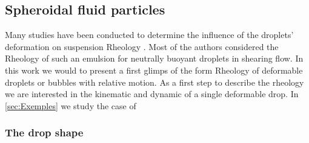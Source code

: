 
\subsection{Spheroidal fluid particles}

Many studies have been conducted to determine the influence of the droplets' deformation on suspension Rheology \citet{goddard1967nonlinear,lhuillier1987phenomenology,maffettone1998equation}.
Most of the authors considered the Rheology of such an emulsion for neutrally buoyant droplets in shearing flow. 
In this work we would to present a first glimps  of the form Rheology of deformable droplets or bubbles with relative motion. 
As a first step to describe the rheology we are interested in the kinematic and dynamic of a single deformable drop. 
In \ref{sec:Exemples} we study the case of 

\subsubsection*{The drop shape}

